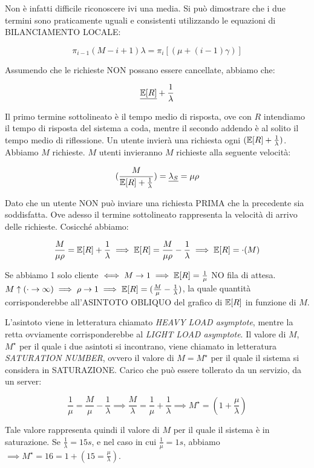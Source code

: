 Non è infatti difficile riconoscere ivi una media. Si può dimostrare che i due termini sono praticamente uguali e consistenti utilizzando le equazioni di BILANCIAMENTO LOCALE:

\[
	\pi_{i-1}(M-i+1)\lambda = \pi_i[(\mu+(i-1)\gamma)]
\]

Assumendo che le richieste NON possano essere cancellate, abbiamo che:

\[
	\underline{\operatorname{\mathbb{E}}[R]} + \frac{1}{\lambda}
\]

Il primo termine sottolineato è il tempo medio di risposta, ove con $R$ intendiamo il tempo di risposta del sistema a coda, mentre il secondo addendo è al solito il tempo medio di riflessione. Un utente invierà una richiesta ogni $(\operatorname{\mathbb{E}}[R]+\frac{1}{\lambda})$. Abbiamo $M$ richieste. $M$ utenti invieranno $M$ richieste alla seguente velocità:

\[
	(\frac{M}{\operatorname{\mathbb{E}}[R]+\frac{1}{\lambda}}) = \underline{\lambda_S} = \mu\rho
\]

Dato che un utente NON può inviare una richiesta PRIMA che la precedente sia soddisfatta. Ove adesso il termine sottolineato rappresenta la velocità di arrivo delle richieste. Cosicché abbiamo:

\[
	\frac{M}{\mu\rho} = \operatorname{\mathbb{E}}[R]+\frac{1}{\lambda} \implies \operatorname{\mathbb{E}}[R] = \frac{M}{\mu\rho} -\frac{1}{\lambda} \implies \operatorname{\mathbb{E}}[R]=\mathord{\cdot}{(M)}
\]

Se abbiamo 1 solo cliente $\iff M\rightarrow 1 \implies \operatorname{\mathbb{E}}[R]=\frac{1}{\mu}$ NO fila di attesa. $M\uparrow (\mathord{\cdot}\to\infty) \implies \rho\to1 \implies \operatorname{\mathbb{E}}[R]=(\frac{M}{\mu}-\frac{1}{\lambda})$, la quale quantità corrisponderebbe all'ASINTOTO OBLIQUO del grafico di $\operatorname{\mathbb{E}}[R]$ in funzione di $M$.

L'asintoto viene in letteratura chiamato \textit{HEAVY LOAD asymptote}, mentre la retta ovviamente corrisponderebbe al \textit{LIGHT LOAD asymptote}. Il valore di $M$, $M^\star$ per il quale i due asintoti si incontrano, viene chiamato in letteratura \textit{SATURATION NUMBER}, ovvero il valore di $M=M^\star$ per il quale il sistema si considera in SATURAZIONE. Carico che può essere tollerato da un servizio, da un server:

\[
	\frac{1}{\mu} = \frac{M}{\mu} -\frac{1}{\lambda} \implies \frac{M}{\lambda} = \frac{1}{\mu}+\frac{1}{\lambda} \implies M^\star = (1+\frac{\mu}{\lambda})
\]

Tale valore rappresenta quindi il valore di $M$ per il quale il sistema è in saturazione. Se $\frac{1}{\lambda}=15 s$, e nel caso in cui $\frac{1}{\mu}=1 s$, abbiamo $\implies M^\star = 16 = 1+(15=\frac{\mu}{\lambda})$.

